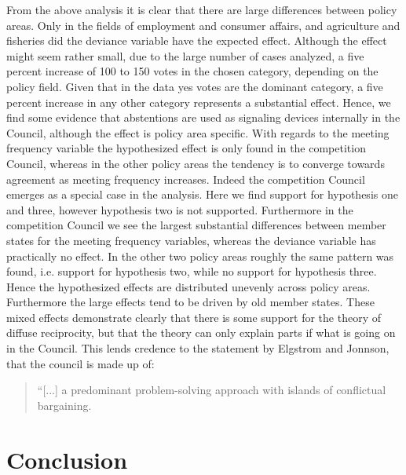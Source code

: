 From the above analysis it is clear that there are large differences between policy areas. Only in the fields of employment and consumer affairs, and agriculture and fisheries did the deviance variable have the expected effect. Although the effect might seem rather small, due to the large number of cases analyzed, a five percent increase of 100 to 150 votes in the chosen category, depending on the policy field. Given that in the data yes votes are the dominant category, a five percent increase in any other category represents a substantial effect. Hence, we find some evidence that abstentions are used as signaling devices internally in the Council, although the effect is policy area specific. With regards to the meeting frequency variable the hypothesized effect is only found in the competition Council, whereas in the other policy areas the tendency is to converge towards agreement as meeting frequency increases. Indeed the competition Council emerges as a special case in the analysis. Here we find support for hypothesis one and three, however hypothesis two is not supported. Furthermore in the competition Council we see the largest substantial differences between member states for the meeting frequency variables, whereas the deviance variable has practically no effect. In the other two policy areas roughly the same pattern was found, i.e. support for hypothesis two, while no support for hypothesis three. Hence the hypothesized effects are distributed unevenly across policy areas. Furthermore the large effects tend to be driven by old member states. These mixed effects demonstrate clearly that there is some support for the theory of diffuse reciprocity, but that the theory can only explain parts if what is going on in the Council. This lends credence to the statement by Elgstrom and Jonnson, that the council is made up of:

\begin{quote}
  ``[...] a predominant problem-solving approach with islands of conflictual bargaining.
\end{quote}

\section{Conclusion}

